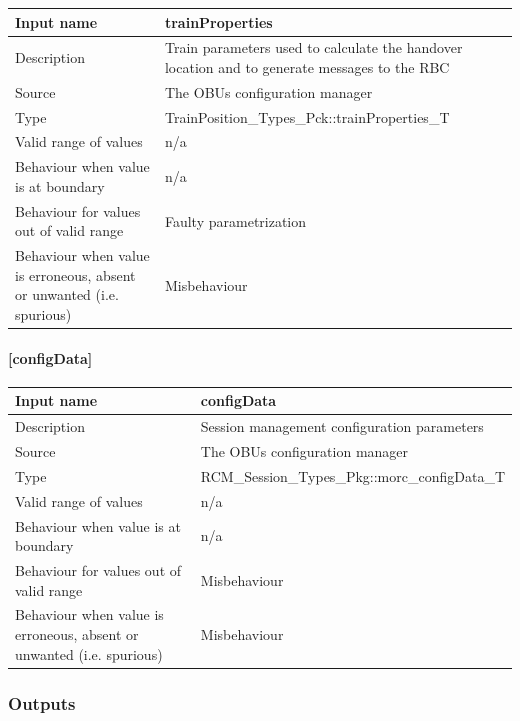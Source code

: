 \begin{longtable}{p{}p{}}
	\toprule
	Input name				& trainProperties \\
	\midrule
	Description				& Train parameters used to calculate the handover location and to generate messages to the RBC \\
	\midrule
	Source					& The OBUs configuration manager \\ 
	\midrule
	Type					& TrainPosition\_Types\_Pck::trainProperties\_T \\
	\midrule
	Valid range of values	& n/a \\
	\midrule
	Behaviour when value is at boundary	& n/a \\
	\midrule
	Behaviour for values out of valid range	& Faulty parametrization \\
	\midrule
	Behaviour when value is erroneous, absent or unwanted (i.e. spurious) & Misbehaviour \\
	\bottomrule
\end{longtable}

\paragraph{[configData]}

\begin{longtable}{p{}p{}}
	\toprule
	Input name				& configData \\
	\midrule
	Description				& Session management configuration parameters \\
	\midrule
	Source					& The OBUs configuration manager \\ 
	\midrule
	Type					& RCM\_Session\_Types\_Pkg::morc\_configData\_T \\
	\midrule
	Valid range of values	& n/a \\
	\midrule
	Behaviour when value is at boundary	& n/a \\
	\midrule
	Behaviour for values out of valid range	& Misbehaviour \\
	\midrule
	Behaviour when value is erroneous, absent or unwanted (i.e. spurious) & Misbehaviour \\
	\bottomrule
\end{longtable}


\subsubsection{Outputs}\label{s:manage_radio_communication_outputs}

